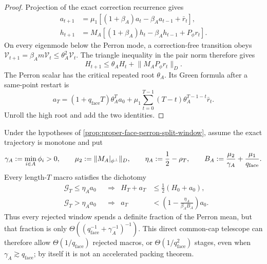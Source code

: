 \documentclass[11pt]{article}
\begin{document}
\begin{proof}
Projection of the exact correction recurrence gives
\begin{align*}
 a_{t+1}
 &=\mu_1[(1+\beta_A)a_t-\beta_Aa_{t-1}+\bar r_t],\\
 h_{t+1}
 &=M_A[(1+\beta_A)h_t-\beta_Ah_{t-1}+P_\phi r_t].
\end{align*}
On every eigenmode below the Perron mode, a correction-free transition obeys
$\mathcal V_{t+1}=\beta_Am\mathcal V_t\leq\theta_A^2\mathcal V_t$.
The triangle inequality in the pair norm therefore gives
\begin{equation*}
 H_{t+1}\leq\theta_AH_t+\lVert M_AP_\phi r_t\rVert_D.
\end{equation*}
The Perron scalar has the critical repeated root $\theta_A$.  Its Green
formula after a same-point restart is
\begin{equation*}
 a_T=(1+q_{\mathrm{face}}T)\theta_A^Ta_0
 +\mu_1\sum_{t=0}^{T-1}(T-t)\theta_A^{T-1-t}\bar r_t.
\end{equation*}
Unroll the high root and add the two identities.
\end{proof}

\begin{corollary}
\label{cor:proper-face-perron-accepted-paid}
Under the hypotheses of
\cref{prop:proper-face-perron-split-window}, assume the exact trajectory is
monotone and put
\begin{equation*}
 \gamma_A:=\min_{i\in A}\phi_i>0,
 \qquad
 \mu_2:=\lVert M_A|_{\phi^\perp}\rVert_D,
 \qquad
 \eta_A:=\frac12-\rho_T,
 \qquad
 B_A:=\frac{\mu_2}{\gamma_A}+\frac{\mu_1}{q_{\mathrm{face}}}.
\end{equation*}
Every length-$T$ macro satisfies the dichotomy
\begin{align*}
 &\mathcal G_T\leq\eta_Aa_0
   &&\Longrightarrow&H_T+a_T&\leq\frac12(H_0+a_0),\\
 &\mathcal G_T>\eta_Aa_0
   &&\Longrightarrow&a_T&<
    \left(1-\frac{\eta_A}{\beta_AB_A}\right)a_0.
\end{align*}
Thus every rejected window spends a definite fraction of the Perron mean,
but that fraction is only
$\Theta((q_{\mathrm{face}}^{-1}+\gamma_A^{-1})^{-1})$.  This direct common-cap telescope
can therefore allow $\Theta(1/q_{\mathrm{face}})$ rejected macros, or
$\Theta(1/q_{\mathrm{face}}^2)$ stages, even when $\gamma_A\gtrsim q_{\mathrm{face}}$; by itself it is
not an accelerated packing theorem.
\end{corollary}
\end{document}
